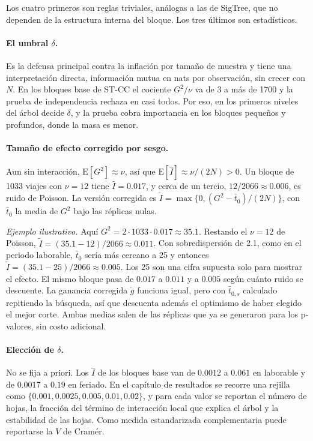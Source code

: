 \documentclass[11pt,a4paper]{article}
\begin{document}
Los cuatro primeros son reglas triviales, análogas a las de SigTree, que no dependen
de la estructura interna del bloque. Los tres últimos son estadísticos.

\paragraph{El umbral $\delta$.} Es la defensa principal contra la inflación por tamaño
de muestra y tiene una interpretación directa, información mutua en nats por
observación, sin crecer con $N$. En los bloques base de ST-CC el cociente $G^2/\nu$
va de 3 a más de 1700 y la prueba de independencia rechaza en casi todos. Por eso, en
los primeros niveles del árbol decide $\delta$, y la prueba cobra importancia en los
bloques pequeños y profundos, donde la masa es menor.

\paragraph{Tamaño de efecto corregido por sesgo.} Aun sin interacción,
$\mathrm{E}[G^2]\approx\nu$, así que $\mathrm{E}[\hat I]\approx\nu/(2N)>0$. Un bloque
de 1033 viajes con $\nu=12$ tiene $\hat I=0.017$, y cerca de un tercio,
$12/2066\approx0.006$, es ruido de Poisson. La versión corregida es
$\tilde I=\max\{0,(G^2-\bar t_0)/(2N)\}$, con $\bar t_0$ la media de $G^2$ bajo las
réplicas nulas.

\emph{Ejemplo ilustrativo.} Aquí $G^2=2\cdot1033\cdot0.017\approx35.1$. Restando el
$\nu=12$ de Poisson, $\tilde I=(35.1-12)/2066\approx0.011$. Con sobredispersión de
2.1, como en el periodo laborable, $\bar t_0$ sería más cercano a 25 y entonces
$\tilde I=(35.1-25)/2066\approx0.005$. Los 25 son una cifra supuesta solo para mostrar
el efecto. El mismo bloque pasa de $0.017$ a $0.011$ y a $0.005$ según cuánto ruido se
descuente. La ganancia corregida $\tilde g$ funciona igual, pero con $\bar t_{0,s}$
calculado repitiendo la búsqueda, así que descuenta además el optimismo de haber
elegido el mejor corte. Ambas medias salen de las réplicas que ya se generaron para
los p-valores, sin costo adicional.

\paragraph{Elección de $\delta$.} No se fija a priori. Los $\hat I$ de los bloques
base van de $0.0012$ a $0.061$ en laborable y de $0.0017$ a $0.19$ en feriado. En el
capítulo de resultados se recorre una rejilla como
$\{0.001,0.0025,0.005,0.01,0.02\}$, y para cada valor se reportan el número de hojas,
la fracción del término de interacción local que explica el árbol y la estabilidad de
las hojas. Como medida estandarizada complementaria puede reportarse la $V$ de
Cramér.
\end{document}
